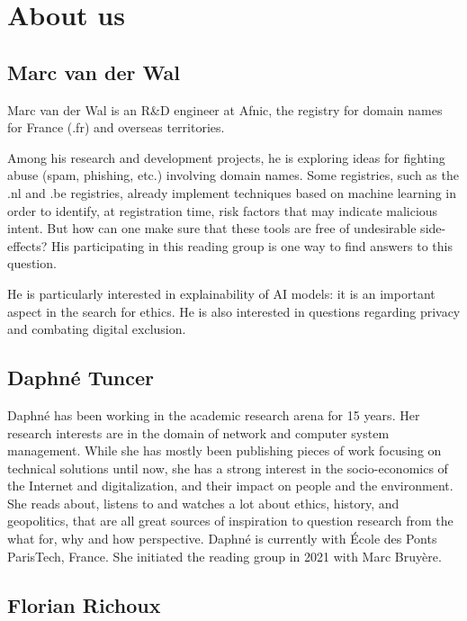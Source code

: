 \documentclass[conference]{IEEEtran}
\begin{document}
\section{About us}

\subsection{Marc van der Wal}

Marc van der Wal is an R\&D engineer at Afnic, the registry for domain
names for France (.fr) and overseas territories.

Among his research and development projects, he is exploring ideas for
fighting  abuse (spam,  phishing, etc.)  involving domain  names. Some
registries,  such as  the .nl  and .be  registries, already  implement
techniques  based  on  machine  learning  in  order  to  identify,  at
registration   time,  risk   factors  that   may  indicate   malicious
intent.  But how  can  one make  sure  that these  tools  are free  of
undesirable side-effects?  His participating in this  reading group is
one way to find answers to this question.

He is particularly interested in explainability of AI models: it is an
important aspect  in the search for  ethics. He is also  interested in
questions regarding privacy and combating digital exclusion.

\subsection{Daphné Tuncer}

Daphné  has  been  working  in  the academic  research  arena  for  15
years.  Her  research interests  are  in  the  domain of  network  and
computer  system  management. While  she  has  mostly been  publishing
pieces of  work focusing on technical  solutions until now, she  has a
strong   interest  in   the  socio-economics   of  the   Internet  and
digitalization, and  their impact on  people and the  environment. She
reads about, listens  to and watches a lot about  ethics, history, and
geopolitics, that  are all  great sources  of inspiration  to question
research  from  the what  for,  why  and  how perspective.  Daphné  is
currently with  École des Ponts  ParisTech, France. She  initiated the
reading group in 2021 with Marc Bruyère.

\subsection{Florian Richoux}
\end{document}

